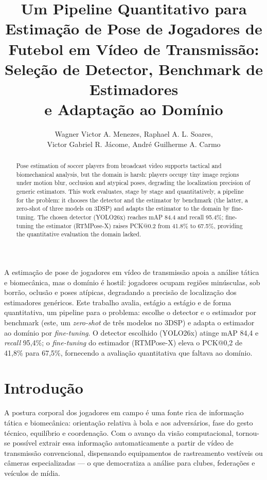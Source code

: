 \documentclass[12pt]{article}
\title{Um Pipeline Quantitativo para Estimação de Pose de Jogadores de Futebol em Vídeo de Transmissão:\\ Seleção de Detector, Benchmark de Estimadores\\ e Adaptação ao Domínio}
\author{Wagner Victor A. Menezes\inst{1}, Raphael A. L. Soares\inst{1}, \\ Victor Gabriel R. Jácome\inst{1}, André Guilherme A. Carmo\inst{1} }
\begin{document}
\maketitle

\begin{abstract}
Pose estimation of soccer players from broadcast video supports tactical and biomechanical analysis, but the domain is harsh: players occupy tiny image regions under motion blur, occlusion and atypical poses, degrading the localization precision of generic estimators. This work evaluates, stage by stage and quantitatively, a pipeline for the problem: it chooses the detector and the estimator by benchmark (the latter, a zero-shot of three models on 3DSP) and adapts the estimator to the domain by fine-tuning. The chosen detector (YOLO26x) reaches mAP 84.4 and recall 95.4\%; fine-tuning the estimator (RTMPose-X) raises PCK@0.2 from 41.8\% to 67.5\%, providing the quantitative evaluation the domain lacked.
\end{abstract}

\begin{resumo}
A estimação de pose de jogadores em vídeo de transmissão apoia a análise tática e biomecânica, mas o domínio é hostil: jogadores ocupam regiões minúsculas, sob borrão, oclusão e poses atípicas, degradando a precisão de localização dos estimadores genéricos. Este trabalho avalia, estágio a estágio e de forma quantitativa, um pipeline para o problema: escolhe o detector e o estimador por benchmark (este, um \emph{zero-shot} de três modelos no 3DSP) e adapta o estimador ao domínio por \emph{fine-tuning}. O detector escolhido (YOLO26x) atinge mAP 84,4 e \emph{recall} 95,4\%; o \emph{fine-tuning} do estimador (RTMPose-X) eleva o PCK@0,2 de 41,8\% para 67,5\%, fornecendo a avaliação quantitativa que faltava ao domínio.
\end{resumo}


\section{Introdução}

A postura corporal dos jogadores em campo é uma fonte rica de informação tática e biomecânica: orientação relativa à bola e aos adversários, fase do gesto técnico, equilíbrio e coordenação. Com o avanço da visão computacional, tornou-se possível extrair essa informação automaticamente a partir de vídeo de transmissão convencional, dispensando equipamentos de rastreamento vestíveis ou câmeras especializadas --- o que democratiza a análise para clubes, federações e veículos de mídia.
\end{document}
